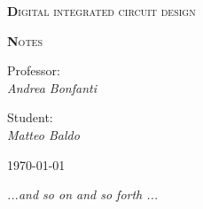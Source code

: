 \begin{titlepage}

	\centering
	{\scshape\huge\textbf Digital integrated circuit design \par}
	{\scshape\huge\textbf Notes \par}	
	\vspace{13cm}
{Professor:\\ \textit{Andrea Bonfanti}}	

\vspace{0.5cm}

{Student:\\ \textit{Matteo Baldo}}

\vspace{2cm}
	\vfill
	\raggedleft
	{\today\par}
	
\vspace{1cm}
\raggedright
{ \it ...and so on and so forth ...}
\end{titlepage}
        \newpage
		\setcounter{page}{2}
        \null 
        \thispagestyle{empty} 
        \newpage  


\tableofcontents
